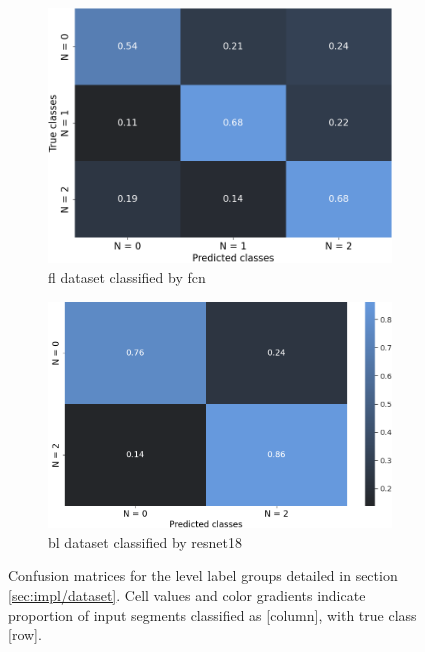 \begin{figure}[h]
    \begin{subfigure}[b]{0.471\textwidth}
        \centering
        \includegraphics[width=\textwidth]{figures/res_FCN_flevel_cm.png}
        \caption{\acrshort{fl} dataset classified by \acrlong{fcn}}
        \label{fig:res/conf_flevel}
    \end{subfigure}
    \begin{subfigure}[b]{0.529\textwidth}
        \centering
        \includegraphics[width=\textwidth]{figures/res_ResNet18_blevel_cm.png}
        \caption{\acrshort{bl} dataset classified by \acrlong{resnet18}}
        \label{fig:res/conf_blevel}
    \end{subfigure}
    \caption{Confusion matrices for the level label groups detailed in section \ref{sec:impl/dataset}. Cell values and color gradients indicate proportion of input segments classified as [column], with true class [row].}
    \label{fig:res/conf_level}
\end{figure}
\FloatBarrier


